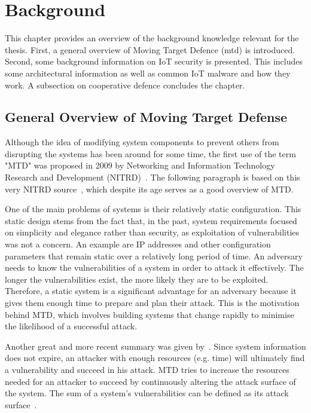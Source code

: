 

\chapter{Background} \label{section:background}
This chapter provides an overview of the background knowledge relevant for the thesis. First, a general overview of Moving Target Defence (\acrshort{mtd}) is introduced. Second, some background information on IoT security is presented. This includes some architectural information as well as common IoT malware and how they work. A subsection on cooperative defence concludes the chapter.

\section{General Overview of Moving Target Defense} \label{section:MTD}
Although the idea of modifying system components to prevent others from disrupting the systems has been around for some time, the first use of the term "MTD" was proposed in 2009 by Networking and Information Technology Research and Development (NITRD)~\cite{navas:2021MTDWhere}. The following paragraph is based on this very NITRD source~\cite{report:GhoshMovingTargetDefense}, which despite its age serves as a good overview of MTD.  

One of the main problems of systems is their relatively static configuration. This static design stems from the fact that, in the past, system requirements focused on simplicity and elegance rather than security, as exploitation of vulnerabilities was not a concern. An example are IP addresses and other configuration parameters that remain static over a relatively long period of time. An adversary needs to know the vulnerabilities of a system in order to attack it effectively. The longer the vulnerabilities exist, the more likely they are to be exploited. Therefore, a static system is a significant advantage for an adversary because it gives them enough time to prepare and plan their attack. This is the motivation behind MTD, which involves building systems that change rapidly to minimise the likelihood of a successful attack. 

Another great and more recent summary was given by~\cite{navas:2021MTDWhere}. Since system information does not expire, an attacker with enough resources (e.g. time) will ultimately find a vulnerability and succeed in his attack. MTD tries to increase the resources needed for an attacker to succeed by continuously altering the attack surface of the system. The sum of a system's vulnerabilities can be defined as its attack surface~\cite{website:IBMAttack}. 



